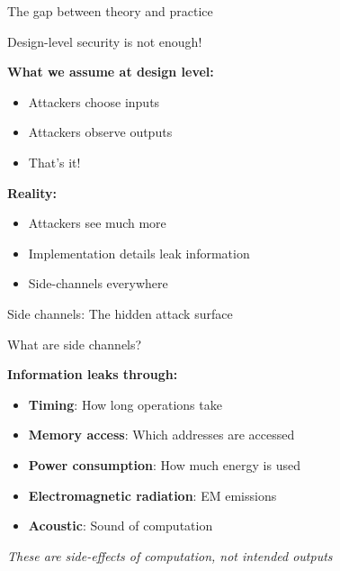 \documentclass[aspectratio=169, lualatex, handout]{beamer}
\begin{document}
\begin{frame}{The gap between theory and practice}
	\begin{center}
		\Large
		Design-level security is not enough!
	\end{center}
	\vspace{1em}
	\textbf{What we assume at design level:}
	\begin{itemize}
		\item Attackers choose inputs
		\item Attackers observe outputs
		\item That's it!
	\end{itemize}
	\vspace{0.5em}
	\textbf{Reality:}
	\begin{itemize}
		\item Attackers see much more
		\item Implementation details leak information
		\item Side-channels everywhere
	\end{itemize}
\end{frame}

\begin{frame}{Side channels: The hidden attack surface}
	\begin{center}
		\Large
		What are side channels?
	\end{center}
	\vspace{1em}
	\textbf{Information leaks through:}
	\begin{itemize}
		\item \textbf{Timing}: How long operations take
		\item \textbf{Memory access}: Which addresses are accessed
		\item \textbf{Power consumption}: How much energy is used
		\item \textbf{Electromagnetic radiation}: EM emissions
		\item \textbf{Acoustic}: Sound of computation
	\end{itemize}
	\vspace{0.5em}
	\begin{center}
		\textit{These are side-effects of computation, not intended outputs}
	\end{center}
\end{frame}
\end{document}
